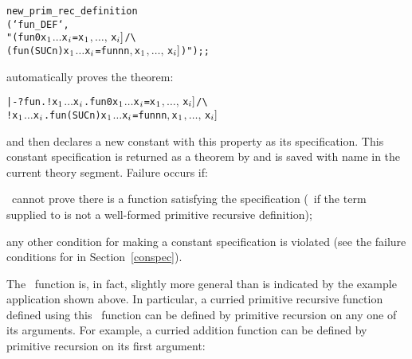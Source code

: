 \begin{hol}\begin{alltt}
   new_prim_rec_definition
    (`fun_DEF`,
     "(fun 0 x\(\sb{1}\) \(\dots\) x\(\sb{i}\) = \m{f\sb{1}[}x\(\sb{1}\)\(,\ldots,\,\)x\(\sb{i}]\) /\verb!\!
      (fun (SUC n) x\(\sb{1}\) \(\dots\) x\(\sb{i}\) = \m{f\sb{2}[}fun n  n\(,\) x\(\sb{1}\)\(,\ldots,\,\)x\(\sb{i}]\))");;
\end{alltt}\end{hol}

\noindent automatically proves the theorem:

\begin{hol}\begin{alltt}
   |-  ?fun. !x\(\sb{1}\) \(\dots\) x\(\sb{i}\). fun 0 x\(\sb{1}\) \(\dots\) x\(\sb{i}\) = \m{f\sb{1}[}x\(\sb{1}\)\(,\ldots,\,\)x\(\sb{i}]\) /\verb!\!
             !x\(\sb{1}\) \(\dots\) x\(\sb{i}\). fun (SUC n) x\(\sb{1}\) \(\dots\) x\(\sb{i}\) = \m{f\sb{2}[}fun n  n\(,\) x\(\sb{1}\)\(,\ldots,\,\)x\(\sb{i}]\)
\end{alltt}\end{hol}

\noindent and then declares a new constant  with this property as its
specification. This constant specification is returned as a theorem by
 and is saved with name 
in the current theory segment. Failure occurs if:

\begin{myenumerate}
\item \HOL\ cannot prove there is a function satisfying the specification
(\ie\ if the term supplied to 
 is not a well-formed primitive recursive definition);
\item any other condition for making a constant specification is violated
(see the failure conditions for  in
Section~\ref{conspec}).
\end{myenumerate}

The \ML\  function   is, in  fact, slightly more
general than  is  indicated  by  the  example  application  shown  above.    In
particular, a  curried
primitive  recursive  function defined  using this \ML\
function can be defined  by primitive  recursion on  any one  of its arguments.
For example, a curried  addition function  \ml{plus:num->num->num} can be
defined by primitive recursion on its first argument:

